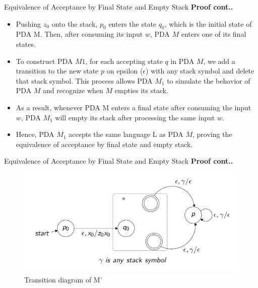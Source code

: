 \documentclass{beamer}
\begin{document}
\begin{frame}{ Equivalence of Acceptance by Final State and Empty Stack}
	\textbf{Proof cont..}
	\begin{itemize}
		\item Pushing $z_0$ onto the stack, $p_0$ enters the state $q_0$, which is the initial state of PDA M. Then, after consuming its input $w$, PDA $M$ enters one of its final states. \item To construct PDA $M1$, for each accepting state $q$ in PDA $M$, we add a transition to the new state $p$ on epsilon ($\epsilon$) with any stack symbol and delete that stack symbol. This process allows PDA $M_1$ to simulate the behavior of PDA $M$ and recognize when $M$ empties its stack.
		
		\item As a result, whenever PDA M enters a final state after consuming the input $w$, PDA $M_1$ will empty its stack after processing the same input $w$.
		\item  Hence, PDA $M_1$ accepts the same language L as PDA $M$, proving the equivalence of acceptance by final state and empty stack.
		
		
	\end{itemize}
\end{frame}
\begin{frame}{ Equivalence of Acceptance by Final State and Empty Stack}
		\textbf{Proof cont..}
\begin{center}
	\begin{figure}
		\includegraphics[scale=.3]{img4/m4}
		\caption{Transition diagram of M'}
	\end{figure}
\end{center}
\end{frame}
\end{document}
